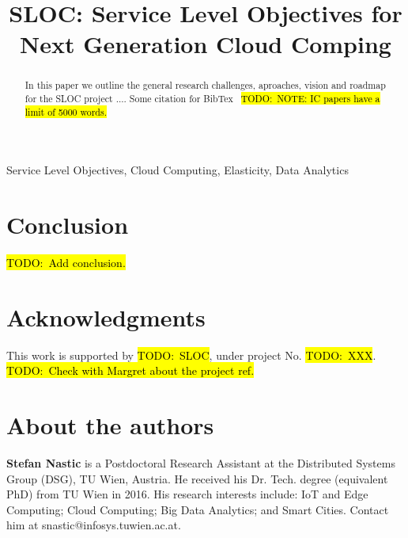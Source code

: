\documentclass[conference]{IEEEtran}
\newcommand{\todo}[1]{\hl{TODO:~#1}}
\begin{document}
\title{SLOC: Service Level Objectives for Next Generation Cloud Comping}

\author{
									
\and	
}


\maketitle
\begin{abstract}
In this paper we outline the general research challenges, aproaches, vision and roadmap for the SLOC project ....
Some citation for BibTex~\cite{nastic2014provisioning}
\todo{NOTE: IC papers have a limit of 5000 words.}
\end{abstract}

\begin{IEEEkeywords}
Service Level Objectives, Cloud Computing, Elasticity, Data Analytics 
\end{IEEEkeywords}



\section{Conclusion}
\label{sec:Conclusion}

\todo{Add conclusion.}

\section*{Acknowledgments}
This work is supported by \todo{SLOC}, under project No. \todo{XXX}.
\todo{Check with Margret about the project ref.}



\section*{About the authors}

\textbf{Stefan Nastic} is a Postdoctoral Research Assistant at the Distributed Systems Group (DSG), 
TU Wien, Austria.  He received his Dr. Tech. degree (equivalent PhD)
from TU Wien in 2016.  
His research interests include: IoT and Edge Computing; 
Cloud Computing; Big Data Analytics; and Smart Cities.
Contact him at snastic@infosys.tuwien.ac.at. \\
\end{document}
